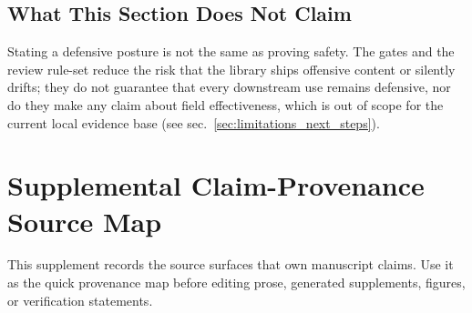 \documentclass[
]{article}
\begin{document}
\subsection{What This Section Does Not
Claim}\label{what-this-section-does-not-claim}

Stating a defensive posture is not the same as proving safety. The gates
and the review rule-set reduce the risk that the library ships offensive
content or silently drifts; they do not guarantee that every downstream
use remains defensive, nor do they make any claim about field
effectiveness, which is out of scope for the current local evidence base
(see sec.~\ref{sec:limitations_next_steps}).

\newpage

\section{Supplemental Claim-Provenance Source
Map}\label{sec:source_surface}

This supplement records the source surfaces that own manuscript claims.
Use it as the quick provenance map before editing prose, generated
supplements, figures, or verification statements.
\end{document}
